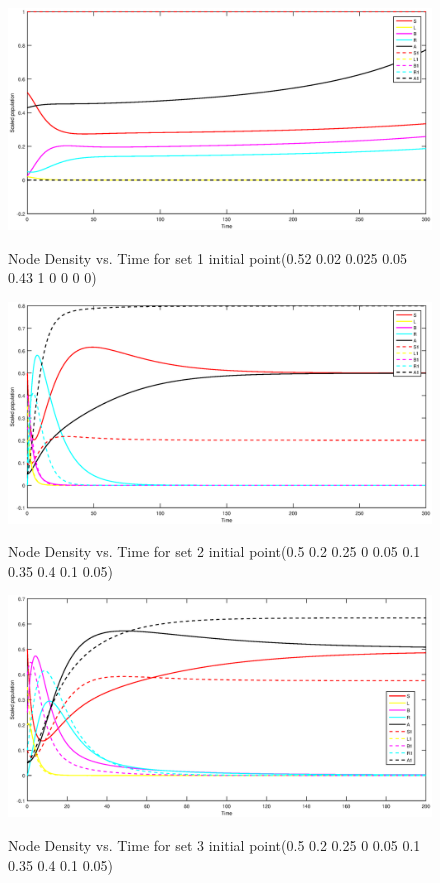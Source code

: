 \begin{figure}[h!]
\centering
  \includegraphics[width=7.0in]{2.eps}\\
  \caption{Node Density vs. Time for set 1 initial point(0.52 0.02 0.025 0.05 0.43 1 0 0 0 0)}\label{fig:ff2}
\end{figure}

\newpage
\begin{figure}[h!]
\centering
  \includegraphics[width=7.0in]{3.eps}\\
  \caption{Node Density vs. Time for set 2 initial point(0.5 0.2 0.25 0 0.05 0.1 0.35 0.4 0.1 0.05)}\label{fig:ff3}
\end{figure}

\begin{figure}[h!]
\centering
  \includegraphics[width=7.0in]{4.eps}\\
  \caption{Node Density vs. Time for set 3 initial point(0.5 0.2 0.25 0 0.05 0.1 0.35 0.4 0.1 0.05)}\label{fig:ff4}
\end{figure}

